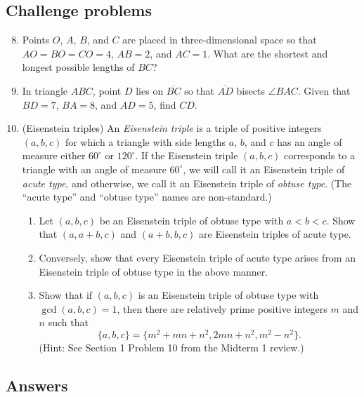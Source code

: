 \subsection{Challenge problems}

\begin{enumerate}\setcounter{enumi}{7}
\item Points $O$, $A$, $B$, and $C$ are placed in three-dimensional space so that $AO = BO = CO = 4$, $AB = 2$, and $AC = 1$. What are the shortest and longest possible lengths of $BC$?
\item In triangle $ABC$, point $D$ lies on $\overline{BC}$ so that $\overline{AD}$ bisects $\angle BAC$. Given that $BD = 7$, $BA = 8$, and $AD = 5$, find $CD$.
\item (Eisenstein triples) An \emph{Eisenstein triple} is a triple of positive integers $(a,b,c)$ for which a triangle with side lengths $a$, $b$, and $c$ has an angle of measure either $60^{\circ}$ or $120^{\circ}$. If the Eisenstein triple $(a,b,c)$ corresponds to a triangle with an angle of measure $60^{\circ}$, we will call it an Eisenstein triple of \emph{acute type}, and otherwise, we call it an Eisenstein triple of \emph{obtuse type}. (The ``acute type'' and ``obtuse type'' names are non-standard.)
\begin{enumerate}
\item Let $(a,b,c)$ be an Eisenstein triple of obtuse type with $a < b < c$. Show that $(a, a + b, c)$ and $(a + b, b, c)$ are Eisenstein triples of acute type.
\item Conversely, show that every Eisenstein triple of acute type arises from an Eisenstein triple of obtuse type in the above manner.
\item Show that if $(a,b,c)$ is an Eisenstein triple of obtuse type with $\gcd(a,b,c) = 1$, then there are relatively prime positive integers $m$ and $n$ such that
\begin{equation*}
\{a,b,c\} = \{m^2 + mn + n^2, 2mn + n^2, m^2 - n^2\}.
\end{equation*}
(Hint: See Section 1 Problem 10 from the Midterm 1 review.)
\end{enumerate}
\end{enumerate}


\newpage
\subsection{Answers}

